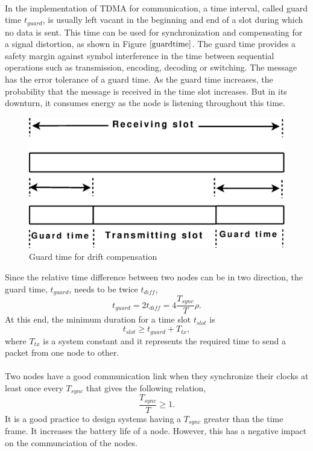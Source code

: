\documentclass[a4paper,10pt]{report}
\begin{document}
\paragraph*{}
In the implementation of TDMA for communication, a time interval, called guard time $t_{guard}$, is usually left vacant in the beginning and end of a slot during which no data is sent. This time can be used for synchronization and compensating for a signal distortion, as shown in Figure $\ref{guardtime}$. The guard time provides a safety margin against symbol interference in the time between sequential operations such as transmission, encoding, decoding or switching. The message has the error tolerance of a guard time. As the guard time increases, the probability that the message is received in the time slot increases. But in its downturn, it consumes energy as the node is listening throughout this time.
\begin{figure}
\centering
\includegraphics[width=0.5 \textwidth]{guardtime}
\caption{Guard time for drift compensation} \label{guardtime}
\end{figure}
Since the relative time difference between two nodes can be in two direction, the guard time, $t_{guard}$, needs to be twice $t_{diff}$,
\begin{equation}
t_{guard}= 2t_{diff} = 4\frac{T_{sync}}{T}\rho.
\end{equation}
At this end, the minimum duration for a time slot $t_{slot}$ is
\begin{equation}
t_{slot} \geq t_{guard} + T_{tx},
\end{equation}
where $T_{tx}$ is a system constant and it represents the required time to send a packet from one node to other.
\paragraph*{} 
Two nodes have a good communication link when they synchronize their clocks at least once every $T_{sync}$ that gives the following
relation,
\begin{equation}
\frac{T_{sync}}{T}\geq 1.
\end{equation}
It is a good practice to design systems having a $T_{sync}$ greater than the time frame. It increases the battery life of a node. However,
this has a negative impact on the communciation of the nodes.
\end{document}
